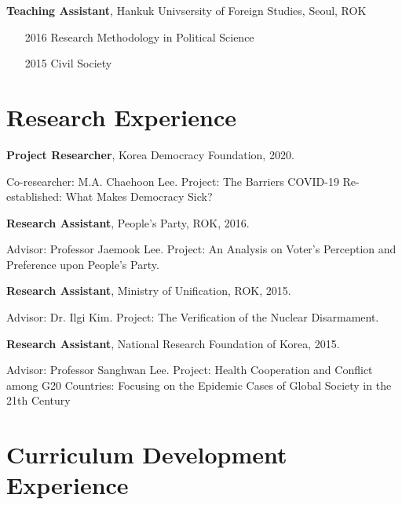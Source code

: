 \documentclass[margin,line]{res}
\begin{document}
\begin{resume}
{\bf Teaching Assistant}, Hankuk Univsersity of Foreign Studies, Seoul, ROK

\begin{itemize} \itemsep -1mm 
	\item[2016] Research Methodology in Political Science
	\item[2015] Civil Society
\end{itemize}

\section{\sc Research Experience}


{\bf Project Researcher}, Korea Democracy Foundation, 2020.

\vspace{-.43cm}
{Co-researcher: M.A. Chaehoon Lee. Project: The Barriers COVID-19 Re-established: What Makes Democracy Sick?} 

\vspace{-.1cm}
{\bf Research Assistant}, People's Party, ROK, 2016.

\vspace{-.43cm}
{Advisor: Professor Jaemook Lee. Project: An Analysis on Voter’s Perception and Preference upon People’s Party.}

\vspace{-.1cm}
{\bf Research Assistant}, Ministry of Unification, ROK, 2015.

\vspace{-.43cm}
{Advisor: Dr. Ilgi Kim. Project: The Verification of the Nuclear Disarmament.}

\vspace{-.1cm}
{\bf Research Assistant}, National Research Foundation of Korea, 2015.

\vspace{-.43cm}
{Advisor: Professor Sanghwan Lee. Project: Health Cooperation and Conflict among G20 Countries: Focusing on the Epidemic Cases of Global Society in the 21th Century}

\section{\sc Curriculum Development Experience}


\end{resume}
\end{document}
